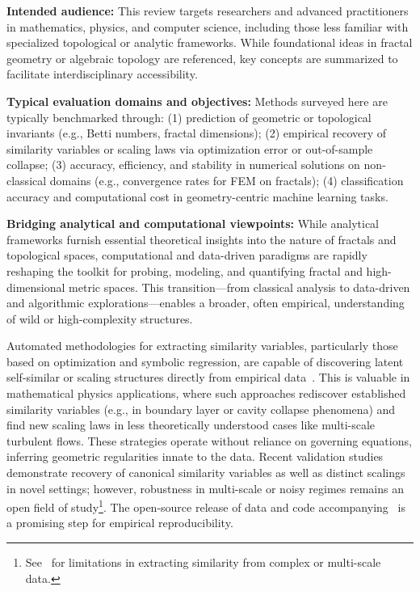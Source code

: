 \documentclass[sigconf]{acmart}
\begin{document}
\textbf{Intended audience:} This review targets researchers and advanced practitioners in mathematics, physics, and computer science, including those less familiar with specialized topological or analytic frameworks. While foundational ideas in fractal geometry or algebraic topology are referenced, key concepts are summarized to facilitate interdisciplinary accessibility.

\textbf{Typical evaluation domains and objectives:} Methods surveyed here are typically benchmarked through: 
(1) prediction of geometric or topological invariants (e.g., Betti numbers, fractal dimensions)\cite{ref26,ref39}; 
(2) empirical recovery of similarity variables or scaling laws via optimization error or out-of-sample collapse\cite{ref65}; 
(3) accuracy, efficiency, and stability in numerical solutions on non-classical domains (e.g., convergence rates for FEM on fractals)\cite{ref29,ref33}; 
(4) classification accuracy and computational cost in geometry-centric machine learning tasks\cite{ref26,ref39}.

\vspace{2mm}
\noindent\textbf{Bridging analytical and computational viewpoints:}
While analytical frameworks furnish essential theoretical insights into the nature of fractals and topological spaces, computational and data-driven paradigms are rapidly reshaping the toolkit for probing, modeling, and quantifying fractal and high-dimensional metric spaces. This transition—from classical analysis to data-driven and algorithmic explorations—enables a broader, often empirical, understanding of wild or high-complexity structures.

Automated methodologies for extracting similarity variables, particularly those based on optimization and symbolic regression, are capable of discovering latent self-similar or scaling structures directly from empirical data~\cite{ref65}. This is valuable in mathematical physics applications, where such approaches rediscover established similarity variables (e.g., in boundary layer or cavity collapse phenomena) and find new scaling laws in less theoretically understood cases like multi-scale turbulent flows. These strategies operate without reliance on governing equations, inferring geometric regularities innate to the data. Recent validation studies~\cite{ref65} demonstrate recovery of canonical similarity variables as well as distinct scalings in novel settings; however, robustness in multi-scale or noisy regimes remains an open field of study\footnote{See~\cite{ref65} for limitations in extracting similarity from complex or multi-scale data.}. The open-source release of data and code accompanying~\cite{ref65} is a promising step for empirical reproducibility.
\end{document}
